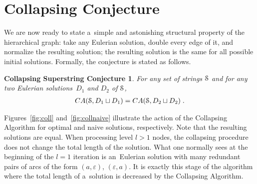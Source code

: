 \section{Collapsing Conjecture}
We are now ready to state a~simple and astonishing structural property of the hierarchical graph: take any Eulerian solution, double every edge of it, and normalize the resulting solution; the resulting solution is the same for all possible initial solutions. Formally, the conjecture is stated as follows.
\newtheorem*{scs}{Collapsing Superstring Conjecture}
\begin{scs}
For any set of strings ${\cal S}$ and for any two Eulerian solutions~$D_1$ and $D_2$ of ${\cal S}$, 
\begin{align*}
CA({\cal S}, D_1 \sqcup D_1) =  CA({\cal S}, D_2 \sqcup D_2) \; .
\end{align*}
\end{scs}

Figures~\ref{fig:coll} and~\ref{fig:collnaive} illustrate the action of
the Collapsing Algorithm for optimal and naive solutions, respectively. Note that the resulting solutions are equal. When processing level $l>1$ nodes, 
the collapsing procedure does not change the total length of the solution. What one normally sees at the beginning of the
$l=1$ iteration is an~Eulerian solution with many 
redundant pairs of arcs of the form $(a, \varepsilon)$, $(\varepsilon, a)$. It is exactly this stage of the algorithm where the total length of a~solution is decreased by the Collapsing Algorithm. 

